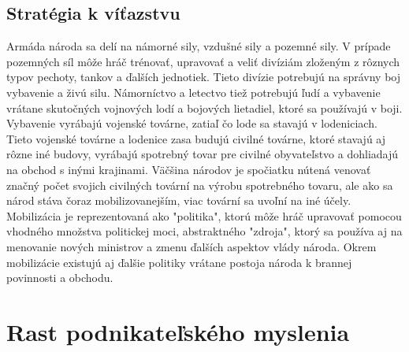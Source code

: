 \documentclass[10pt,oneside,slovak,a4paper]{article}
\begin{document}
\subsection{Stratégia k víťazstvu}
Armáda národa sa delí na námorné sily, vzdušné sily a pozemné sily. V prípade pozemných síl môže hráč trénovať, upravovať a veliť divíziám zloženým z rôznych typov pechoty, tankov a ďalších jednotiek. Tieto divízie potrebujú na správny boj vybavenie a živú silu. Námorníctvo a letectvo tiež potrebujú ľudí a vybavenie vrátane skutočných vojnových lodí a bojových lietadiel, ktoré sa používajú v boji. Vybavenie vyrábajú vojenské továrne, zatiaľ čo lode sa stavajú v lodeniciach. Tieto vojenské továrne a lodenice zasa budujú civilné továrne, ktoré stavajú aj rôzne iné budovy, vyrábajú spotrebný tovar pre civilné obyvateľstvo a dohliadajú na obchod s inými krajinami. Väčšina národov je spočiatku nútená venovať značný počet svojich civilných tovární na výrobu spotrebného tovaru, ale ako sa národ stáva čoraz mobilizovanejším, viac tovární sa uvoľní na iné účely. Mobilizácia je reprezentovaná ako "politika", ktorú môže hráč upravovať pomocou vhodného množstva politickej moci, abstraktného "zdroja", ktorý sa používa aj na menovanie nových ministrov a zmenu ďalších aspektov vlády národa. Okrem mobilizácie existujú aj ďalšie politiky vrátane postoja národa k brannej povinnosti a obchodu.

\section{Rast podnikateľského myslenia}
\end{document}
